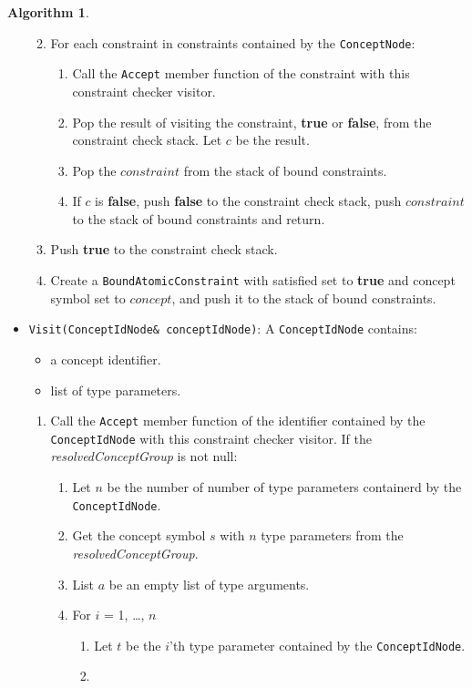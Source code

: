 \documentclass[a4paper,oneside,11pt]{book}
\theoremstyle{definition}
\newtheorem{algo}{Algorithm}[section]
\begin{document}
\begin{algo}
\begin{itemize}
\begin{enumerate}
\begin{enumerate}
\end{enumerate}
\item
For each constraint in constraints contained by the \verb|ConceptNode|:
\begin{enumerate}
\item
Call the \verb|Accept| member function of the constraint with this constraint checker visitor.
\item
Pop the result of visiting the constraint, \textbf{true} or \textbf{false}, from the constraint check stack. Let $c$ be the result.
\item
Pop the $constraint$ from the stack of bound constraints.
\item
If $c$ is \textbf{false}, push \textbf{false} to the constraint check stack, push $constraint$ to the stack of bound constraints and return.
\end{enumerate}
\item
Push \textbf{true} to the constraint check stack.
\item
Create a \verb|BoundAtomicConstraint| with satisfied set to \textbf{true} and concept symbol set to $concept$, and push it to the stack of bound constraints.
\end{enumerate}
\item
\verb|Visit(ConceptIdNode& conceptIdNode)|:
A \verb|ConceptIdNode| contains:
\begin{itemize}
\item
a concept identifier.
\item
list of type parameters.
\end{itemize}
\begin{enumerate}
\item
Call the \verb|Accept| member function of the identifier contained by the \verb|ConceptIdNode| with this constraint checker visitor.
If the \emph{resolvedConceptGroup} is not null:
\begin{enumerate}
\item
Let $n$ be the number of number of type parameters containerd by the \verb|ConceptIdNode|.
\item
Get the concept symbol $s$ with $n$ type parameters from the \emph{resolvedConceptGroup}.
\item
List $a$ be an empty list of type arguments.
\item
For $i$ = 1, \ldots, $n$
\begin{enumerate}
\item
Let $t$ be the $i$'th type parameter contained by the \verb|ConceptIdNode|.
\item

\end{enumerate}
\end{enumerate}
\end{enumerate}
\end{itemize}
\end{algo}
\end{document}
